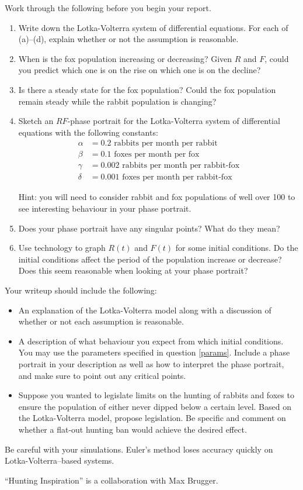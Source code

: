 	Work through the following before you begin your report.

	\begin{enumerate}[label=\emph{\arabic*.}]
		\item Write down the Lotka-Volterra system of differential equations.  For
			each of (a)--(d), explain whether or not the assumption is reasonable.
		\item When is the fox population increasing or decreasing?  Given $R$ and $F$,
			could you predict which one is on the rise on which one is on the decline?
		\item Is there a steady state for the fox population?  Could the fox population
			remain steady while the rabbit population is changing?
		\item \label{params}
			Sketch an $RF$-phase portrait for the Lotka-Volterra system of differential
			equations with the following constants:
			\begin{align*}
				\alpha &= 0.2\text{ rabbits per month per rabbit}\\
				\beta &= 0.1\text{ foxes per month per fox}\\
				\gamma &= 0.002\text{ rabbits per month per rabbit-fox}\\
				\delta &= 0.001\text{ foxes per month per rabbit-fox}
			\end{align*}

			Hint: you will need to consider rabbit and fox populations of well over
			100 to see interesting behaviour in your phase portrait.
		\item Does your phase portrait have any singular points?  What do they mean?
		\item Use technology to graph $R(t)$ and $F(t)$ for some initial conditions.  
			Do the initial conditions affect the period of the population increase
			or decrease?  Does this seem reasonable when looking at your phase portrait?
	\end{enumerate}


	Your writeup should include the following:
	\begin{itemize}
		\item An explanation of the Lotka-Volterra model along with a discussion of
			whether or not each assumption is reasonable.
		\item A description of what behaviour you expect from which initial conditions.  You may use
			the parameters specified in question \ref{params}.  Include a phase portrait in
			your description as well as how to interpret the phase portrait, and make sure to point
			out any critical points.
		\item Suppose you wanted to legislate limits on the hunting of rabbits and foxes to ensure the population of either
			never dipped below a certain level.  Based on the Lotka-Volterra model, propose
			legislation.  Be specific and comment on whether a flat-out hunting ban
			would achieve the desired effect.
	\end{itemize}


	Be careful with your simulations.  Euler's method loses accuracy quickly on Lotka-Volterra--based systems.




\vfill

\hfill ``Hunting Inspiration'' is a collaboration with Max Brugger.




\begin{noexercises}
\end{noexercises}